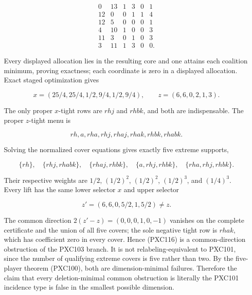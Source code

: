 \documentclass[11pt]{article}
\begin{document}
\begin{equation}
\begin{array}{rrrrrr}
0&13&1&3&0&1\\
12&0&0&1&1&4\\
12&5&0&0&0&1\\
4&10&1&0&0&3\\
11&3&0&1&0&3\\
3&11&1&3&0&0.
\end{array}                                                  \tag{PXC116a}
\end{equation}

Every displayed allocation lies in the resulting core and one attains each
coalition minimum, proving exactness; each coordinate is zero in a displayed
allocation.  Exact staged optimization gives


\begin{equation}
 x=(25/4,25/4,1/2,9/4,1/2,9/4),\qquad
 z=(6,6,0,2,1,3).                                           \tag{PXC116b}
\end{equation}

The only proper \(x\)-tight rows are \(rhj\) and \(rhbk\), and both are
indispensable.  The proper \(z\)-tight menu is


\begin{equation}
 rh, a, rha, rhj, rhaj, rhak, rhbk, rhabk.            \tag{PXC116c}
\end{equation}

Solving the normalized cover equations gives exactly five extreme supports,


\begin{equation}
 \{rh\},\quad \{rhj,rhabk\},\quad \{rhaj,rhbk\},\quad
 \{a,rhj,rhbk\},\quad \{rha,rhj,rhbk\}.                   \tag{PXC116d}
\end{equation}

Their respective weights are \(1/2\), \((1/2)^2\), \((1/2)^2\),
\((1/2)^3\), and \((1/4)^3\).  Every lift has the
same lower selector \(x\) and upper selector


\begin{equation}
 z'=(6,6,0,5/2,1,5/2)\ne z.                                \tag{PXC116e}
\end{equation}

The common direction \(2(z'-z)=(0,0,0,1,0,-1)\) vanishes on
the complete certificate and the union of all five covers; the sole negative
tight row is \(rhak\), which has coefficient zero in every cover.  Hence
(PXC116) is a common-direction obstruction of the PXC103 branch.  It is not
relabeling-equivalent to PXC101, since the number of qualifying extreme
covers is five rather than two.  By the five-player theorem (PXC100), both
are dimension-minimal failures.  Therefore the claim that every
deletion-minimal common obstruction is literally the PXC101 incidence type
is false in the smallest possible dimension.
\end{document}
